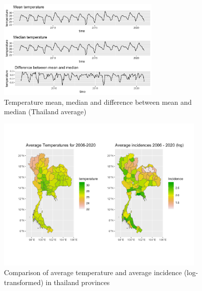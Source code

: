 \documentclass[parskip]{scrartcl}
\begin{document}
\begin{figure}[htbp] 
	\centering
	\includegraphics[width=0.7\textwidth]{fig/mean_median_temp.png}
	\caption{Temperature mean, median and difference between mean and median (Thailand average)}
	\label{fig:mean_median_temp}
\end{figure}


\begin{figure}[htbp] 
	\centering
	\includegraphics[width=0.9\textwidth]{fig/t_vs_ilog.jpg}
	\caption{Comparison of average temperature and average incidence (log-transformed) in thailand provinces}
	\label{fig:tvsilogmap}
\end{figure}


	
\end{document}
